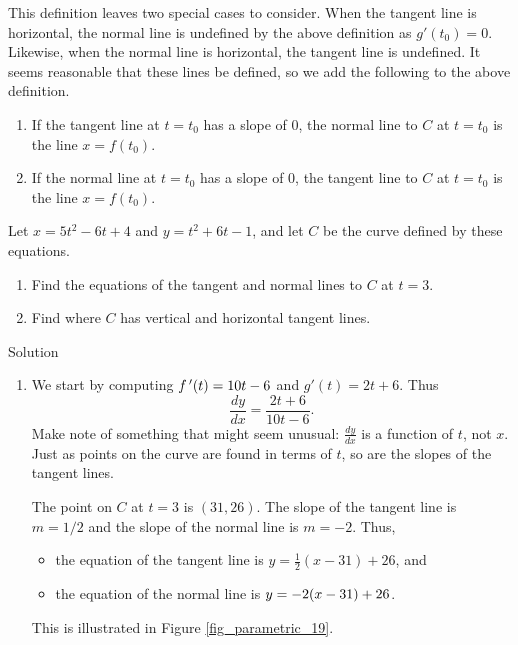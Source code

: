 This definition leaves two special cases to consider. When the tangent line is horizontal, the normal line is undefined by the above definition as $g'(t_0)=0$. Likewise, when the normal line is horizontal, the tangent line is undefined. It seems reasonable that these lines be defined, so we add the following to the above definition.

	
\begin{enumerate}
	\item If the tangent line at $t=t_0$ has a slope of 0, the normal line to $C$ at $t=t_0$ is the line $x=f(t_0)$.
	\item		If the normal line at $t=t_0$ has a slope of 0, the tangent line to $C$ at $t=t_0$ is the line $x=f(t_0)$.
	\end{enumerate}

\begin{example}\label{ex_parcalc1}
Let $x=5t^2-6t+4$ and $y=t^2+6t-1$, and let $C$ be the curve defined by these equations.
\begin{enumerate}
	\item Find the equations of the tangent and normal lines to $C$ at $t=3$.
	\item	Find where $C$ has vertical and horizontal tangent lines.
\end{enumerate}

Solution 

\begin{enumerate}
		\item We start by computing $f\,'(t) = 10t-6$ and $g'(t) =2t+6$. Thus $$\frac{dy}{dx} = \frac{2t+6}{10t-6}.$$
		Make note of something that might seem unusual: $\frac{dy}{dx}$ is a function of $t$, not $x$. Just as points on the curve are found in terms of $t$, so are the slopes of the tangent lines.
		
		The point on $C$ at $t=3$ is $(31,26)$. The slope of the tangent line is $m=1/2$ and the slope of the normal line is $m=-2$. Thus,
		\begin{itemize}
			\item the equation of the tangent line is $y=\frac12(x-31)+26$, and
			\item	the equation of the normal line is $\displaystyle y=-2(x-31)+26$.
		\end{itemize}
		This is illustrated in Figure \ref{fig_parametric_19}.
		

\end{enumerate}
\end{example}

